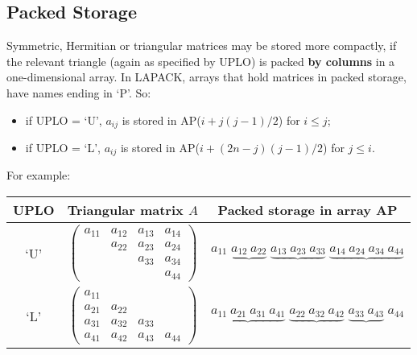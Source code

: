 \subsection{Packed Storage}\label{subsecpacked}

Symmetric, Hermitian or triangular matrices may be stored more
compactly, if the relevant 
triangle (again as specified by UPLO) is packed
{\bf by columns} in a one-dimensional array. In LAPACK, arrays that hold
matrices in packed storage, have names ending in `P'. So:

\begin {itemize}

\item if UPLO = `U', $a_{ij}$ is stored in AP($i+j(j-1)/2$) for $i \leq j$;

\item if UPLO = `L', $a_{ij}$ is stored in AP($i+(2n-j)(j-1)/2$) for 
$j \leq i$.

\end{itemize}

For example:

\begin{center}
\begin{tabular}{|c|c|c|} \hline
UPLO & Triangular matrix $A$ & Packed storage in array AP \\ \hline
`U' &
$
\left( \begin{array}{cccc}
a_{11} & a_{12} & a_{13} & a_{14} \\
       & a_{22} & a_{23} & a_{24} \\
       &        & a_{33} & a_{34} \\
       &        &        & a_{44}
\end{array} \right)
$
&
$
a_{11} \; \underbrace{a_{12} \: a_{22}} \;
\underbrace{a_{13} \: a_{23} \: a_{33}} \;
\underbrace{a_{14} \: a_{24} \: a_{34} \: a_{44}}
$
\\ \hline
`L' &
$
\left( \begin{array}{cccc}
a_{11} &        &        &        \\
a_{21} & a_{22} &        &        \\
a_{31} & a_{32} & a_{33} &        \\
a_{41} & a_{42} & a_{43} & a_{44}
\end{array} \right)
$
&
$
\underbrace{a_{11} \: a_{21} \: a_{31} \: a_{41}} \;
\underbrace{a_{22} \: a_{32} \: a_{42}} \;
\underbrace{a_{33} \: a_{43}} \; a_{44}
$ 
\\ \hline
\end{tabular}
\end{center}

